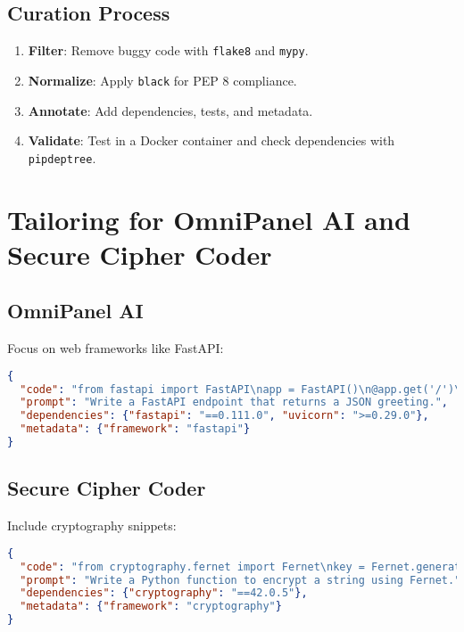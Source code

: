 \documentclass[12pt]{article}
\begin{document}
\subsection{Curation Process}
\begin{enumerate}
  \item \textbf{Filter}: Remove buggy code with \texttt{flake8} and \texttt{mypy}.
  \item \textbf{Normalize}: Apply \texttt{black} for PEP 8 compliance.
  \item \textbf{Annotate}: Add dependencies, tests, and metadata.
  \item \textbf{Validate}: Test in a Docker container and check dependencies with \texttt{pipdeptree}.
\end{enumerate}

\section{Tailoring for OmniPanel AI and Secure Cipher Coder}
\subsection{OmniPanel AI}
Focus on web frameworks like FastAPI:
\begin{lstlisting}[language=JSON, caption=FastAPI Snippet]
{
  "code": "from fastapi import FastAPI\napp = FastAPI()\n@app.get('/')\nasync def root(): return {'message': 'Hello'}",
  "prompt": "Write a FastAPI endpoint that returns a JSON greeting.",
  "dependencies": {"fastapi": "==0.111.0", "uvicorn": ">=0.29.0"},
  "metadata": {"framework": "fastapi"}
}
\end{lstlisting}

\subsection{Secure Cipher Coder}
Include cryptography snippets:
\begin{lstlisting}[language=JSON, caption=Cryptography Snippet]
{
  "code": "from cryptography.fernet import Fernet\nkey = Fernet.generate_key()\ncipher = Fernet(key)\nencrypted = cipher.encrypt(b'Secret')",
  "prompt": "Write a Python function to encrypt a string using Fernet.",
  "dependencies": {"cryptography": "==42.0.5"},
  "metadata": {"framework": "cryptography"}
}
\end{lstlisting}

\end{document}
